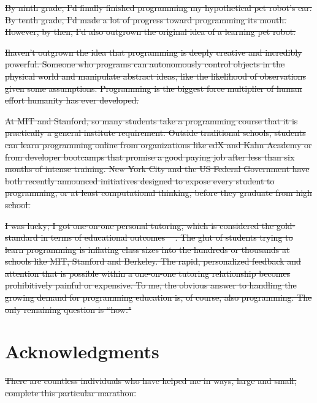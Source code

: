 \documentclass[12pt,twoside]{mitthesis}
\providecommand{\DIFdeltex}[1]{{\protect\color{red}\sout{#1}}}                      %
\providecommand{\DIFdelbegin}{} %
\providecommand{\DIFdelend}{} %
\providecommand{\DIFdel}[1]{\texorpdfstring{\DIFdeltex{#1}}{}} %
\begin{document}
\DIFdel{By ninth grade, I'd finally finished programming my hypothetical pet robot's ear. By tenth grade, I'd made a lot of progress toward programming its mouth. However, by then, I'd also outgrown the original idea of a learning pet robot. }%

\DIFdel{Ihaven't outgrown the idea that programming is deeply creative and incredibly powerful. Someone who programs can autonomously control objects in the physical world and manipulate abstract ideas, like the likelihood of observations given some assumptions. Programming is the biggest force multiplier of human effort humanity has ever developed.
}%

\DIFdel{At MIT and Stanford, so many students take a programming course that it is practically a general institute requirement. Outside traditional schools, students can learn programming online from organizations like edX and Kahn Academy or from developer bootcamps that promise a good paying job after less than six months of intense training. New York City and the US Federal Government have both recently announced initiatives designed to expose every student to programming, or at least computational thinking, before they graduate from high school. }%

\DIFdel{I was lucky; I got one-on-one personal tutoring, which is considered the gold-standard in terms of educational outcomes \mbox{%
\cite{bloom}}%
. The glut of students trying to learn programming is inflating class sizes into the hundreds or thousands at schools like MIT, Stanford and Berkeley. The rapid, personalized feedback and attention that is possible within a one-on-one tutoring relationship becomes prohibitively painful or expensive. To me, the obvious answer to handling the growing demand for programming education is, of course, also programming. The only remaining question is ``how."
}%

\DIFdelend \cleardoublepage

\section*{Acknowledgments}

\DIFdelbegin %
\DIFdel{There are countless individuals who have helped me in ways, large and small, complete this particular marathon. 
}%
\end{document}
